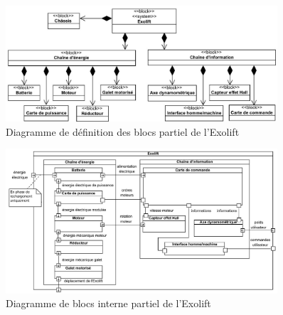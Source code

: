 \begin{figure}[!htb]
\begin{center}
\includegraphics[width=0.9\textwidth]{images/2023_10_30_d11e80da56f59e3b3cdfg-03(1)}
\caption{Diagramme de définition des blocs partiel de l'Exolift \label{fig3}}
\end{center}
\end{figure}



\begin{figure}[!htb]
\begin{center}
\includegraphics[width=0.9\textwidth]{images/2023_10_30_d11e80da56f59e3b3cdfg-04(1)}
\caption{Diagramme de blocs interne partiel de l'Exolift \label{fig4}}
\end{center}
\end{figure}


\fi




